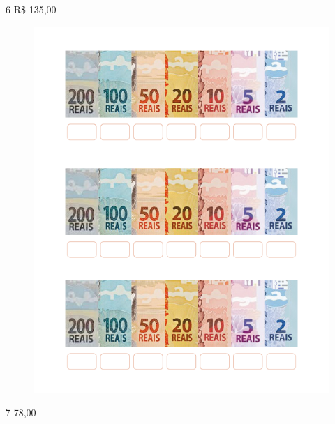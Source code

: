 

\pagebreak
\num{6} R\$ 135,00

\begin{figure}[htpb!]
\includegraphics[width=.9\textwidth]{./media/image69.png}
\end{figure}



\pagebreak
\num{7} 78,00

